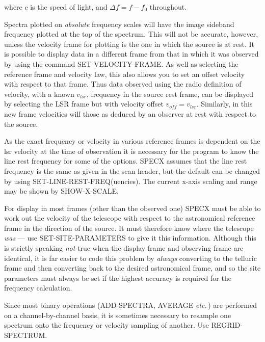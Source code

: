 \documentclass[11pt,twoside]{report}
\newcommand{\etc}{{\it etc.\,}}
\begin{document}
where $c$ is the speed of light, and $\Delta f = f-f_0$ throughout.

Spectra plotted on {\em absolute} frequency scales will have the image sideband
frequency plotted at the top of the spectrum. 
This will not be accurate, however, unless the velocity frame for plotting is
the one in which the source is at rest. It is possible to display data in a
different frame from that in which it was observed by using the command
SET-VELOCITY-FRAME. As well as selecting the
reference frame and velocity law, this also allows you to set an offset
velocity with respect to that frame. Thus data observed using the radio
definition of velocity, with a known $v_{lsr}$, frequency in the source rest
frame, can be displayed by selecting the LSR frame but with velocity offset
$v_{off}=v_{lsr}$. Similarly, in this new frame velocities will those as
deduced by an observer at rest with respect to the source. 

As the exact frequency or velocity in various reference frames is dependent on
the lsr velocity at the time of observation it is necessary for the program to
know the line rest frequency for some of the options. SPECX assumes that the
line rest frequency is the same as given in the scan header, but
the default can be changed by using SET-LINE-REST-FREQ(uencies). The current
x-axis scaling and range may be shown by SHOW-X-SCALE. 

For display in most frames (other than the observed one) SPECX must be able to
work out the velocity of the telescope with respect to the astronomical
reference frame  in the direction of the
source. It must therefore know where the telescope  {\em was}
--- use SET-SITE-PARAMETERS to give it this information. Although this is
strictly speaking {\em not} true when the display frame and observing frame
are identical, it is far easier to code this problem by {\em always} converting
to the telluric frame and then converting back to the desired astronomical frame,
and so the site parameters must always be set if the highest accuracy is
required for the frequency calculation.

Since most binary operations (ADD-SPECTRA, AVERAGE \etc) are performed on a
 channel-by-channel
basis, it is sometimes necessary to resample one spectrum  onto the frequency or velocity sampling of
another. Use REGRID-SPECTRUM. 
\end{document}
